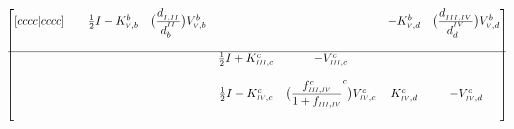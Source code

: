 \documentclass{article}
\newcommand{\RomCap}[1]
    {\MakeUppercase{\scaleto{\romannumeral #1}{3.5pt}}}
\newcommand{\myfrac}[3][0pt]{\genfrac{}{}{}{}{\raisebox{#1}{$#2$}}{\raisebox{-#1}{$#3$}}}
\begin{document}
\begin{equation}
\begin{bmatrix}[cccc|cccc]
			 &  & 	
			
			\iffalse
	     	A_{43} &
			\fi

			\frac{1}{2}I-K^{b}_{\RomCap{5},b} & 

			\iffalse
	     	A_{44} &
			\fi

			\big(\myfrac[3pt]{d_{_{\RomCap{1},\RomCap{2}}}}{d_{b}^{^\RomCap{2}}}\big)V^{b}_{\RomCap{5},b} &

	     	\iffalse
	     	A_{45} & A_{46} & 
	     	\fi
			
	     	 &	 &

	     	\iffalse
	     	A_{47} & 
	     	\fi
			
	     	-K^{b}_{\RomCap{5},d} &

			\iffalse
	     	A_{48} \\
			\fi

			\big(\myfrac[3pt]{d_{_{\RomCap{3},\RomCap{4}}}}{d_{d}^{^\RomCap{4}}}\big)V^{b}_{\RomCap{5},d} \\ 
             &  &  &  &  &  &  & \\
            \hline
	     	\iffalse
	     	Row 5 : A_{51} & A_{52} & A_{53} & A_{54} &
			\fi
			
	     	 &  &  &  & 

	     	\iffalse
	     	A_{55} & A_{56} &
			\fi
			
	     	\frac{1}{2}I+K^{c}_{\RomCap{3},c} & -V^{c}_{\RomCap{3},c} &  

	     	\iffalse
	     	A_{57} & A_{58} \\
			\fi

			 &  \\ 
             &  &  &  &  &  &  & \\
	     	\iffalse
	     	Row 6 : A_{61} & A_{62} & A_{63} & A_{64} &
			\fi
			
	     	 &  &  &  & 

	     	\iffalse
	     	A_{65} &
			\fi
			
			\frac{1}{2}I-K^{c}_{\RomCap{4},c} & 	
			
			\iffalse
	     	A_{66} &
			\fi
	     	
	     	\big(\myfrac[3pt]{f_{\RomCap{3},\RomCap{4}}^{c}}{1+f_{\RomCap{3},\RomCap{4}}}^{c}\big)V^{c}_{\RomCap{4},c} &
	     	
	     	\iffalse
	     	A_{67} & A_{68} \\
			\fi

			K^{c}_{\RomCap{4},d} & -V^{c}_{\RomCap{4},d} \\ 
            &  &  &  &  &  &  & \\
	     	\iffalse
	     	Row 7 : A_{71} & A_{72} & A_{73} & A_{74} &
			\fi
			

\end{bmatrix}
\end{equation}
\end{document}
